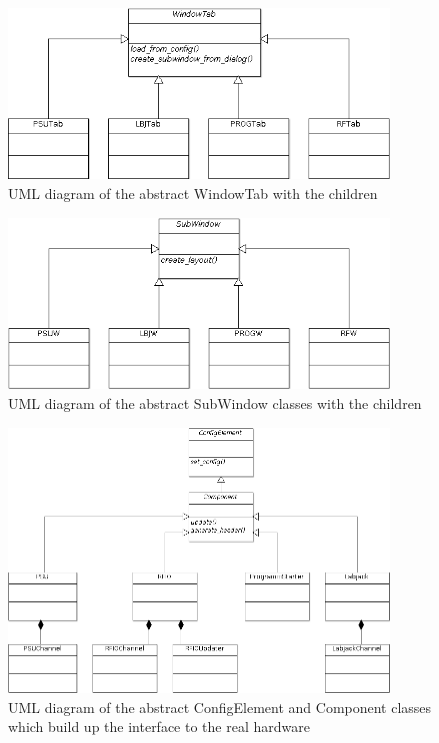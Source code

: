 \documentclass[10pt,a4paper]{article}
\begin{document}
\begin{figure}[H]
\centering
\includegraphics[width=0.9\textwidth]{./A_WindowTabDiagramm.png}
\caption{UML diagram of the abstract WindowTab with the children}
\end{figure}

\begin{figure}[H]
\centering
\includegraphics[width=0.9\textwidth]{./A_SubWindowDiagramm.png}
\caption{UML diagram of the abstract SubWindow classes with the children}
\end{figure}

\begin{figure}[H]
\centering
\includegraphics[width=0.9\textwidth]{./A_ComponentDiagramm.png}
\caption{UML diagram of the abstract ConfigElement and Component classes which build up the interface to the real hardware}
\end{figure}
\end{document}
